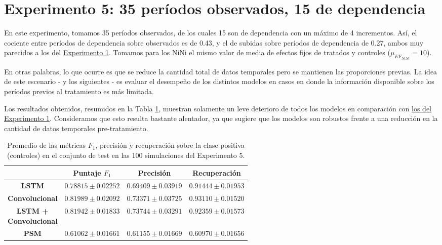 \documentclass[../../main.tex]{subfiles}
\begin{document}
\section{Experimento 5: 35 períodos observados, 15 de dependencia} \label{sec:exp5}
En este experimento, tomamos 35 períodos observados, de los cuales 15 son de dependencia
con un máximo de 4 incrementos. Así, el cociente entre períodos de dependencia sobre
observados es de 0.43, y el de subidas sobre períodos de dependencia de 0.27, ambos muy
parecidos a los del \hyperref[sec:exp1]{Experimento 1}. Tomamos para los NiNi el mismo
valor de media de efectos fijos de tratados y controles (\(\mu_{{EF}_{NiNi}} = 10\)).

En otras palabras, lo que ocurre es que se reduce la cantidad total de datos temporales
pero se mantienen las proporciones previas. La idea de este escenario - y los siguientes -
es evaluar el desempeño de los distintos modelos en casos en donde la información
disponible sobre los períodos previos al tratamiento es más limitada.

Los resultados obtenidos, resumidos en la Tabla \ref{tab:results_exp5}, muestran solamente
un leve deterioro de todos los modelos en comparación con \hyperref[tab:results_exp1]{los
del Experimento 1}. Consideramos que esto resulta bastante alentador, ya que sugiere que
los modelos son robustos frente a una reducción en la cantidad de datos temporales
pre-tratamiento.

\begin{table}[H]
    \centering
    \renewcommand{\arraystretch}{1.2}
    \begin{tabular}{|c|c|c|c|}
        \hline
         & \textbf{Puntaje} \(F_1\) & \textbf{Precisión} & \textbf{Recuperación} \\ \hline\hline
        \textbf{LSTM}
            & $0.78815 \pm 0.02252$ & $0.69409 \pm 0.03919$ & $0.91444 \pm 0.01953$ \\ \hline
        \textbf{Convolucional}
            & $\mathbf{0.81989 \pm 0.02092}$ & $0.73371 \pm 0.03725$ & $\mathbf{0.93110 \pm 0.01520}$ \\ \hline
        \makecell{\textbf{LSTM +} \\ \textbf{Convolucional}}
            & $0.81942 \pm 0.01833$ & $\mathbf{0.73744 \pm 0.03291}$ & $0.92359 \pm 0.01573$ \\ \hline
        \textbf{PSM}
            & $0.61062 \pm 0.01661$ & $0.61155 \pm 0.01669$ & $0.60970 \pm 0.01656$ \\
        \hline
    \end{tabular}
    \caption{Promedio de las métricas \(F_1\), precisión y recuperación sobre la
    clase positiva (controles) en el conjunto de test en las 100 simulaciones del
    Experimento 5.}
    \label{tab:results_exp5}
\end{table}
\end{document}
